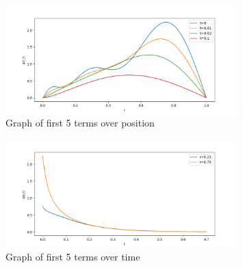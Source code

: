 \documentclass[letterpaper, reqno,11pt]{article}
\begin{document}
\begin{figure}[htpb]
    \centering
    \includegraphics[width=0.8\textwidth]{1}
    \caption{Graph of first 5 terms over position}
    \label{fig:1}
\end{figure}

\begin{figure}[htpb]
    \centering
    \includegraphics[width=0.8\textwidth]{2}
    \caption{Graph of first 5 terms over time}
    \label{fig:2}
\end{figure}
\end{document}
